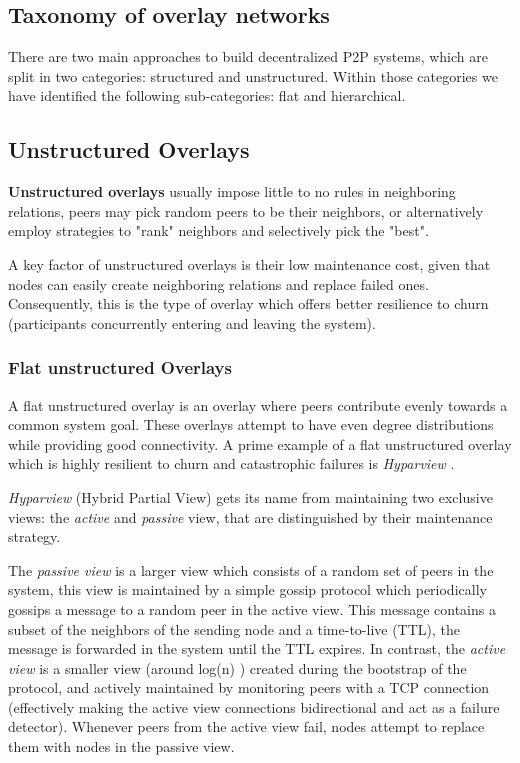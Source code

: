 \subsection{Taxonomy of overlay networks}

There are two main approaches to build decentralized P2P systems, which are split in two categories: structured and unstructured. Within those categories we have identified the following sub-categories: flat and hierarchical. 

\subsection{Unstructured Overlays}

\textbf{Unstructured overlays} usually impose little to no rules in neighboring relations, peers may pick random peers to be their neighbors, or alternatively employ strategies to "rank" neighbors and selectively pick the "best".

A key factor of unstructured overlays is their low maintenance cost, given that nodes can easily create neighboring relations and replace failed ones. Consequently, this is the type of overlay which offers better resilience to churn \cite{stutzbach2006understanding} (participants concurrently entering and leaving the system).

\subsubsection{Flat unstructured Overlays}

A flat unstructured overlay is an overlay where peers contribute evenly towards a common system goal. These overlays attempt to have even degree distributions while providing good connectivity. A prime example of a flat unstructured overlay which is highly resilient to churn and catastrophic failures is \textit{Hyparview} \cite{Hyparview}. 

\textit{Hyparview} (Hybrid Partial View) gets its name from maintaining two exclusive views: the \textit{active} and \textit{passive} view, that are distinguished by their maintenance strategy. 

The \textit{passive view} is a larger view which consists of a random set of peers in the system, this view is maintained by a simple gossip protocol which periodically gossips a message to a random peer in the active view. This message contains a subset of the neighbors of the sending node and a time-to-live (TTL), the message is forwarded in the system until the TTL expires. In contrast, the \textit{active view} is a smaller view (around log(n) ) created during the bootstrap of the protocol, and actively maintained by monitoring peers with a TCP connection (effectively making the active view connections bidirectional and act as a failure detector). Whenever peers from the active view fail, nodes attempt to replace them with nodes in the passive view.

